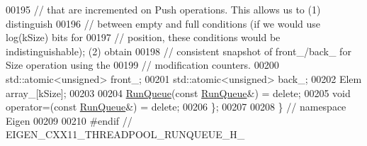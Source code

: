 \begin{DoxyCode}
00195   \textcolor{comment}{// that are incremented on Push operations. This allows us to (1) distinguish}
00196   \textcolor{comment}{// between empty and full conditions (if we would use log(kSize) bits for}
00197   \textcolor{comment}{// position, these conditions would be indistinguishable); (2) obtain}
00198   \textcolor{comment}{// consistent snapshot of front\_/back\_ for Size operation using the}
00199   \textcolor{comment}{// modification counters.}
00200   std::atomic<unsigned> front\_;
00201   std::atomic<unsigned> back\_;
00202   Elem array\_[kSize];
00203 
00204   \hyperlink{class_eigen_1_1_run_queue}{RunQueue}(\textcolor{keyword}{const} \hyperlink{class_eigen_1_1_run_queue}{RunQueue}&) = \textcolor{keyword}{delete};
00205   \textcolor{keywordtype}{void} operator=(\textcolor{keyword}{const} \hyperlink{class_eigen_1_1_run_queue}{RunQueue}&) = \textcolor{keyword}{delete};
00206 \};
00207 
00208 \}  \textcolor{comment}{// namespace Eigen}
00209 
00210 \textcolor{preprocessor}{#endif  // EIGEN\_CXX11\_THREADPOOL\_RUNQUEUE\_H\_}
\end{DoxyCode}
